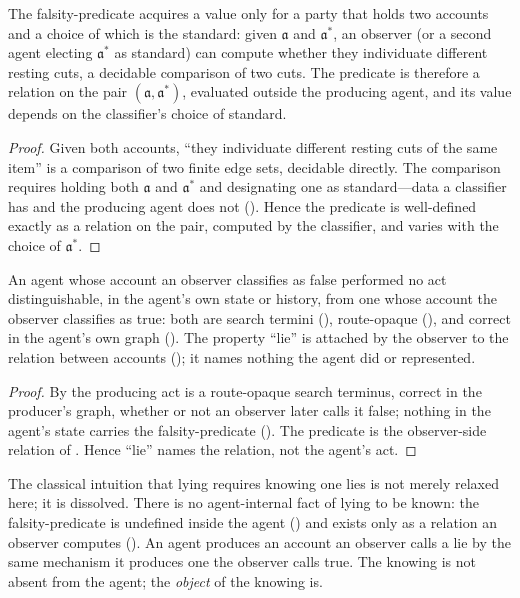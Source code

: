 \documentclass[11pt,twocolumn,a4paper]{article}
\newcommand{\acct}{\mathfrak{a}}   %
\begin{document}
\begin{theorem}
\label{thm:falsityrelation}
The falsity-predicate acquires a value only for a party that holds two
accounts and a choice of which is the standard: given $\acct$ and
$\acct^\ast$, an observer (or a second agent electing $\acct^\ast$ as
standard) can compute whether they individuate different resting cuts, a
decidable comparison of two cuts. The predicate is therefore a relation on
the pair $(\acct,\acct^\ast)$, evaluated outside the producing agent, and
its value depends on the classifier's choice of standard.
\end{theorem}

\begin{proof}
Given both accounts, ``they individuate different resting cuts of the same
item'' is a comparison of two finite edge sets, decidable directly. The
comparison requires holding both $\acct$ and $\acct^\ast$ and designating
one as standard---data a classifier has and the producing agent does not
(). Hence the predicate is well-defined exactly
as a relation on the pair, computed by the classifier, and varies with the
choice of $\acct^\ast$.
\end{proof}

\begin{corollary}
\label{cor:noliar}
An agent whose account an observer classifies as false performed no act
distinguishable, in the agent's own state or history, from one whose account
the observer classifies as true: both are search termini
(), route-opaque (), and correct in
the agent's own graph (). The property ``lie'' is
attached by the observer to the relation between accounts
(); it names nothing the agent did or represented.
\end{corollary}

\begin{proof}
By  the producing act is a
route-opaque search terminus, correct in the producer's graph, whether or
not an observer later calls it false; nothing in the agent's state carries
the falsity-predicate (). The predicate is the
observer-side relation of . Hence ``lie'' names
the relation, not the agent's act.
\end{proof}

\begin{principle}
\label{prin:nolie}
The classical intuition that lying requires knowing one lies is not merely
relaxed here; it is dissolved. There is no agent-internal fact of lying to
be known: the falsity-predicate is undefined inside the agent
() and exists only as a relation an observer
computes (). An agent produces an account an
observer calls a lie by the same mechanism it produces one the observer
calls true. The knowing is not absent from the agent; the \emph{object} of
the knowing is.
\end{principle}
\end{document}
